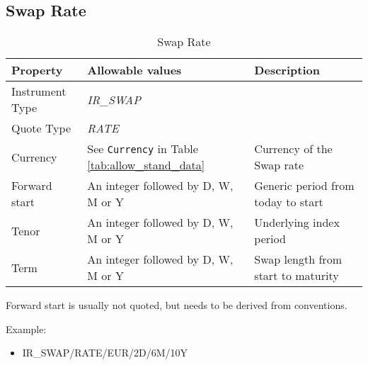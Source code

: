 


\subsection{Swap Rate}

\begin{table}[H]
\centering
  \begin{tabular}{|p{3cm}|p{3.5cm}|p{7cm}|}
    \hline
    {\bf Property} & {\bf Allowable values} & {\bf Description} \\ \hline
    Instrument Type & \emph{IR\_SWAP} & \\ \hline
    Quote Type & \emph{RATE} & \\ \hline
    Currency & See \lstinline!Currency! in Table \ref{tab:allow_stand_data} & Currency of the Swap rate\\ \hline
    Forward start & An integer followed by D, W, M or Y & Generic period from today to start\\ \hline
    Tenor & An integer followed by D, W, M or Y & Underlying index period \\ \hline
    Term & An integer followed by D, W, M or Y & Swap length from start to maturity\\ \hline
  \end{tabular}
  \caption{Swap Rate}
  \label{tab:swaprate_quote}
\end{table}


Forward start is usually not quoted, but needs to be derived from conventions.

\medskip
Example:
\begin{itemize}
\item {IR\_SWAP/RATE/EUR/2D/6M/10Y}
\end{itemize}



